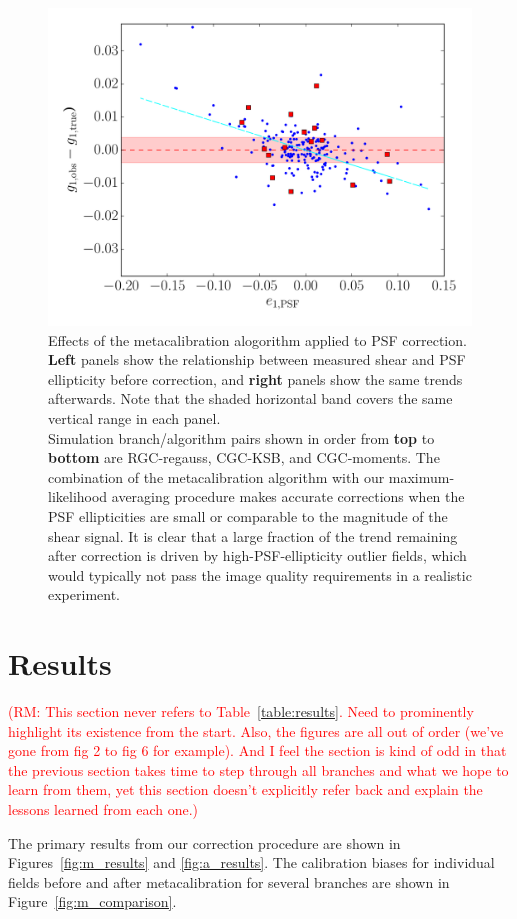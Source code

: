 \documentclass[iop]{emulateapj}
\newcommand\rmcomment[1]{\textcolor{red}{(RM: #1)}}
\begin{document}
\begin{figure}
\begin{center}
\includegraphics[width=0.4\linewidth]{./Plots/psf_e1-moments-opt-shear_plots.pdf}
\end{center}
\caption{Effects of the metacalibration alogorithm applied to PSF
  correction. {\bf Left} panels show the relationship between measured
  shear and PSF ellipticity before correction, and {\bf right} panels
  show the same trends afterwards. Note that the shaded horizontal
  band covers the same vertical range in each panel.  \\
  Simulation branch/algorithm pairs shown in order from {\bf top} to
  {\bf bottom} are RGC-regauss, CGC-KSB, and CGC-moments. The
  combination of the metacalibration algorithm with our
  maximum-likelihood averaging procedure makes accurate corrections
  when the PSF ellipticities are small or comparable to the magnitude
  of the shear signal. It is clear that a large fraction of the trend
  remaining after correction is driven by high-PSF-ellipticity outlier
  fields, which would typically not pass the image quality
  requirements in a realistic experiment.}
\label{fig:psf_trends}
\end{figure}



\section{Results}
\rmcomment{This section never refers to Table~\ref{table:results}.  Need to prominently highlight
  its existence from the start.  Also, the figures are all out of order (we've gone from fig 2 to
  fig 6 for example).  And I feel the section is kind of odd in that the previous section takes time
to step through all branches and what we hope to learn from them, yet this section doesn't
explicitly refer back and explain the lessons learned from each one.}

The primary results from our correction procedure are shown in
Figures~\ref{fig:m_results} and \ref{fig:a_results}. The calibration
biases for individual fields before and after metacalibration for
several branches are shown in Figure~\ref{fig:m_comparison}. 
\end{document}
